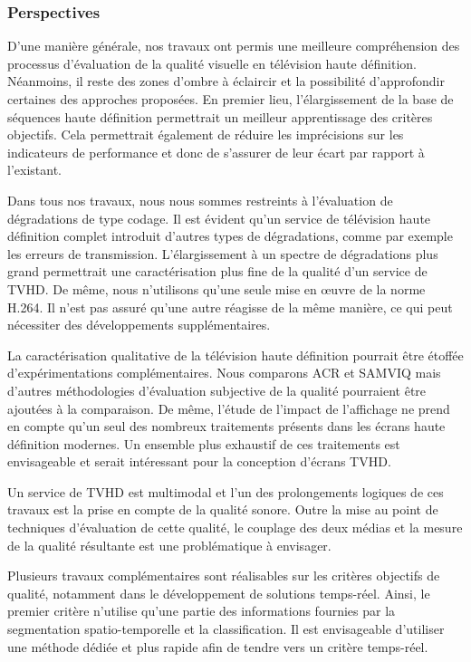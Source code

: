 \subsubsection*{Perspectives}
D'une manière générale, nos travaux ont permis une meilleure compréhension des processus d'évaluation de la qualité visuelle en télévision haute définition. Néanmoins, il reste des zones d'ombre à éclaircir et la possibilité d'approfondir certaines des approches proposées. En premier lieu, l'élargissement de la base de séquences haute définition permettrait un meilleur apprentissage des critères objectifs. Cela permettrait également de réduire les imprécisions sur les indicateurs de performance et donc de s'assurer de leur écart par rapport à l'existant.

Dans tous nos travaux, nous nous sommes restreints à l'évaluation de dégradations de type codage. Il est évident qu'un service de télévision haute définition complet introduit d'autres types de dégradations, comme par exemple les erreurs de transmission. L'élargissement à un spectre de dégradations plus grand permettrait une caractérisation plus fine de la qualité d'un service de TVHD. De même, nous n'utilisons qu'une seule mise en \oe uvre de la norme H.264. Il n'est pas assuré qu'une autre réagisse de la même manière, ce qui peut nécessiter des développements supplémentaires.

\bigskip

La caractérisation qualitative de la télévision haute définition pourrait être étoffée d'expérimentations complémentaires. Nous comparons ACR et SAMVIQ mais d'autres méthodologies d'évaluation subjective de la qualité pourraient être ajoutées à la comparaison. De même, l'étude de l'impact de l'affichage ne prend en compte qu'un seul des nombreux traitements présents dans les écrans haute définition modernes. Un ensemble plus exhaustif de ces traitements est envisageable et serait intéressant pour la conception d'écrans TVHD.

Un service de TVHD est multimodal et l'un des prolongements logiques de ces travaux est la prise en compte de la qualité sonore. Outre la mise au point de techniques d'évaluation de cette qualité, le couplage des deux médias et la mesure de la qualité résultante est une problématique à envisager.

\bigskip

Plusieurs travaux complémentaires sont réalisables sur les critères objectifs de qualité, notamment dans le développement de solutions temps-réel. Ainsi, le premier critère n'utilise qu'une partie des informations fournies par la segmentation spatio-temporelle et la classification. Il est envisageable d'utiliser une méthode dédiée et plus rapide afin de tendre vers un critère temps-réel.

